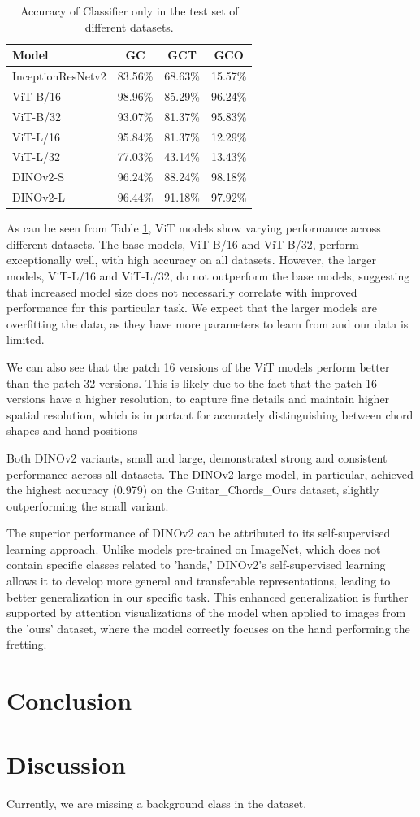 \documentclass[10pt,twocolumn,letterpaper]{article}
\begin{document}
\begin{table}[h]
  \centering
  \begin{tabular}{lccc}
    \toprule
    \textbf{Model} & \textbf{GC} & \textbf{GCT} & \textbf{GCO} \\
    \midrule
    InceptionResNetv2 & 83.56\% & 68.63\% & 15.57\% \\
    \midrule
    ViT-B/16 & 98.96\% & 85.29\% & 96.24\% \\
    ViT-B/32 & 93.07\% & 81.37\% & 95.83\% \\
    ViT-L/16 & 95.84\% & 81.37\% & 12.29\% \\
    ViT-L/32 & 77.03\% & 43.14\% & 13.43\% \\
    DINOv2-S & 96.24\% & 88.24\% & 98.18\% \\
    DINOv2-L & 96.44\% & 91.18\% & 97.92\% \\
    \bottomrule
  \end{tabular}
  \caption{Accuracy of Classifier only in the test set of different datasets.}
  \label{tab:transformer-models-results}
\end{table}

As can be seen from Table \ref{tab:transformer-models-results}, ViT models show varying performance across different datasets. The base models, ViT-B/16 and ViT-B/32, perform exceptionally well, with high accuracy on all datasets. However, the larger models, ViT-L/16 and ViT-L/32, do not outperform the base models, suggesting that increased model size does not necessarily correlate with improved performance for this particular task. We expect that the larger models are overfitting the data, as they have more parameters to learn from and our data is limited.

We can also see that the patch 16 versions of the ViT models perform better than the patch 32 versions. This is likely due to the fact that the patch 16 versions have a higher resolution, to capture fine details and maintain higher spatial resolution, which is important for accurately distinguishing between chord shapes and hand positions

Both DINOv2 variants, small and large, demonstrated strong and consistent performance across all datasets. The DINOv2-large model, in particular, achieved the highest accuracy (0.979) on the Guitar\_Chords\_Ours dataset, slightly outperforming the small variant.

The superior performance of DINOv2 can be attributed to its self-supervised learning approach. Unlike models pre-trained on ImageNet, which does not contain specific classes related to 'hands,' DINOv2's self-supervised learning allows it to develop more general and transferable representations, leading to better generalization in our specific task. This enhanced generalization is further supported by attention visualizations of the model when applied to images from the 'ours' dataset, where the model correctly focuses on the hand performing the fretting.

\section{Conclusion}

\section{Discussion}
Currently, we are missing a background class in the dataset.


 {\small
  
  
 }
\end{document}
